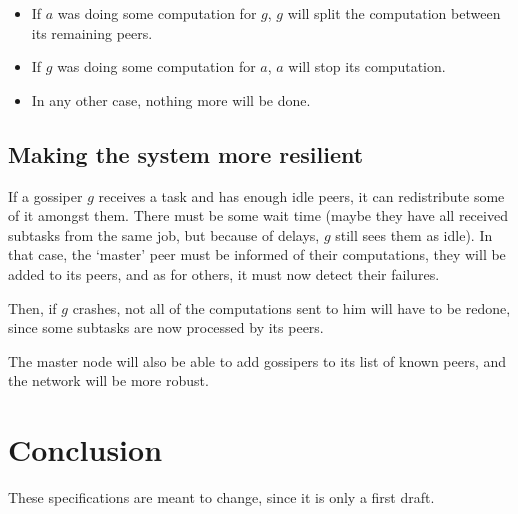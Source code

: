 \documentclass[a4paper,12pt]{article}
\begin{document}
\begin{itemize}
\item If $a$ was doing some computation for $g$, $g$ will split the computation between its remaining peers.
\item If $g$ was doing some computation for $a$, $a$ will stop its computation.
\item In any other case, nothing more will be done. 
\end{itemize}

    \subsection{Making the system more resilient}
    If a gossiper $g$ receives a task and has enough idle peers, it can redistribute some of it amongst them. There must be some wait time (maybe they have all received subtasks from the same job, but because of delays, $g$ still sees them as idle).
In that case, the ‘master’ peer must be informed of their computations, they will be added to its peers, and as for others, it must now detect their failures.

    Then, if $g$ crashes, not all of the computations sent to him will have to be redone, since some subtasks are now processed by its peers.

    The master node will also be able to add gossipers to its list of known peers, and the network will be more robust.

\section{Conclusion}
    These specifications are meant to change, since it is only a first draft.
    
\end{document}
